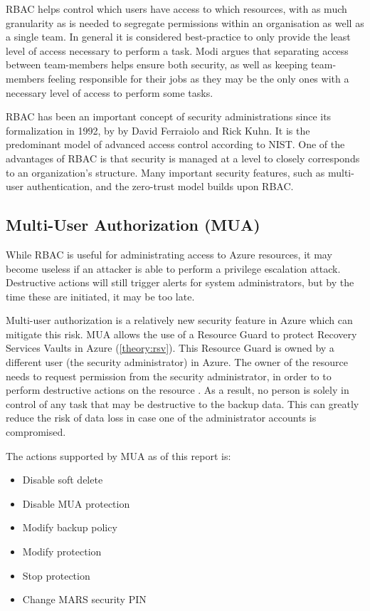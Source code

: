 RBAC helps control which users have access to which resources,
with as much granularity as is needed to segregate permissions within an organisation as well as a single team.
In general it is considered best-practice to only provide the least level of access necessary to perform a task.
Modi argues that separating access between team-members helps ensure both security,
as well as keeping team-members feeling responsible for their jobs as they may be the 
only ones with a necessary level of access to perform some tasks. 
 
RBAC has been an important concept of security administrations since its formalization in 1992, by by David Ferraiolo and Rick Kuhn.
It is the predominant model of advanced access control according to NIST.
One of the advantages of RBAC is that security is managed at a level to closely corresponds to an organization's structure.
Many important security features,
such as multi-user authentication, and the zero-trust model builds upon RBAC.

\subsection{Multi-User Authorization (MUA)} \label{MUAtheory}

While RBAC is useful for administrating access to Azure resources,
it may become useless if an attacker is able to perform a \gls{privilege escalation} attack.
Destructive actions will still trigger alerts for system administrators,
but by the time these are initiated, it may be too late.

Multi-user authorization is a relatively new security feature in Azure which can mitigate this risk.
MUA allows the use of a Resource Guard to protect Recovery Services Vaults in Azure (\ref{theory:rsv}).
This Resource Guard is owned by a different user (the security administrator) in Azure.
The owner of the resource needs to request permission from the security administrator,
in order to to perform destructive actions on the resource \cite{noauthor_protect_2021}.
As a result, no person is solely in control of any task that may be destructive to the backup data.
This can greatly reduce the risk of data loss in case one of the administrator accounts is compromised.

The actions supported by MUA as of this report is:
\begin{itemize}
    \item Disable soft delete
    \item Disable MUA protection	
    \item Modify backup policy	
    \item Modify protection	
    \item Stop protection	
    \item Change MARS security PIN	
\end{itemize}


